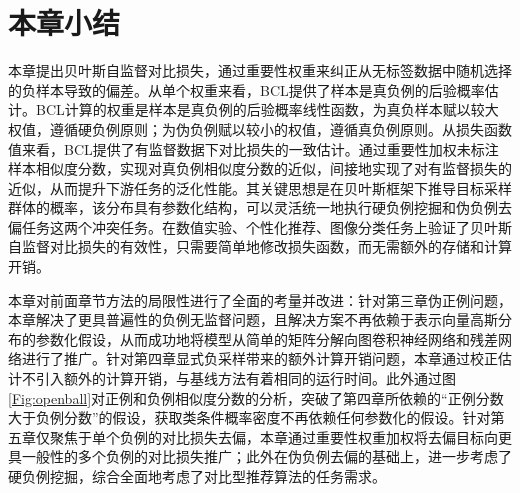 \section{本章小结}
本章提出贝叶斯自监督对比损失，通过重要性权重来纠正从无标签数据中随机选择的负样本导致的偏差。从单个权重来看，BCL提供了样本是真负例的后验概率估计。BCL计算的权重是样本是真负例的后验概率线性函数，为真负样本赋以较大权值，遵循硬负例原则；为伪负例赋以较小的权值，遵循真负例原则。从损失函数值来看，BCL提供了有监督数据下对比损失的一致估计。通过重要性加权未标注样本相似度分数，实现对真负例相似度分数的近似，间接地实现了对有监督损失的近似，从而提升下游任务的泛化性能。其关键思想是在贝叶斯框架下推导目标采样群体的概率，该分布具有参数化结构，可以灵活统一地执行硬负例挖掘和伪负例去偏任务这两个冲突任务。在数值实验、个性化推荐、图像分类任务上验证了贝叶斯自监督对比损失的有效性，只需要简单地修改损失函数，而无需额外的存储和计算开销。

本章对前面章节方法的局限性进行了全面的考量并改进：针对第三章伪正例问题，本章解决了更具普遍性的负例无监督问题，且解决方案不再依赖于表示向量高斯分布的参数化假设，从而成功地将模型从简单的矩阵分解向图卷积神经网络和残差网络进行了推广。针对第四章显式负采样带来的额外计算开销问题，本章通过校正估计不引入额外的计算开销，与基线方法有着相同的运行时间。此外通过图\ref{Fig:openball}对正例和负例相似度分数的分析，突破了第四章所依赖的“正例分数大于负例分数”的假设，获取类条件概率密度不再依赖任何参数化的假设。针对第五章仅聚焦于单个负例的对比损失去偏，本章通过重要性权重加权将去偏目标向更具一般性的多个负例的对比损失推广；此外在伪负例去偏的基础上，进一步考虑了硬负例挖掘，综合全面地考虑了对比型推荐算法的任务需求。
